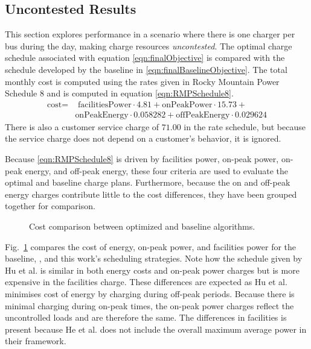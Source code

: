 \subsection{Uncontested Results}
This section explores performance in a scenario where there is one charger per bus during the day, making charge resources \textit{uncontested}. The optimal charge schedule associated with equation \eqref{eqn:finalObjective} is compared with the schedule developed by the baseline in \eqref{eqn:finalBaselineObjective}. The total monthly cost is computed using the rates given in Rocky Mountain Power Schedule 8 and is computed in equation \eqref{eqn:RMPSchedule8}.
	\begin{equation}\label{eqn:RMPSchedule8}
		\begin{aligned}
			\text{cost} = & \text{ facilitiesPower}\cdot 4.81 + \text{onPeakPower}\cdot 15.73 + \\ 
			& \text{onPeakEnergy}\cdot 0.058282 + \text{offPeakEnergy}\cdot 0.029624
		\end{aligned}
	\end{equation}
	There is also a customer service charge of $71.00$ in the rate schedule, but because the service charge does not depend on a customer's behavior, it is ignored.
\par Because \eqref{eqn:RMPSchedule8} is driven by facilities power, on-peak power, on-peak energy, and off-peak energy, these four criteria are used to evaluate the optimal and baseline charge plans.  Furthermore, because the on and off-peak energy charges contribute little to the cost differences, they have been grouped together for comparison.
\begin{figure}
	\centering
	\caption{Cost comparison between optimized and baseline algorithms.}
	\label{fig:costComparison}
\end{figure}
	\par  Fig.~\ref{fig:costComparison} compares the cost of energy, on-peak power, and facilities power for the baseline, \cite{He_2022_Battery}, and this work's scheduling strategies. Note how the schedule given by Hu et al. is similar in both energy costs and on-peak power charges but is more expensive in the facilities charge. These differences are expected as Hu et al. minimises cost of energy by charging during off-peak periods. Because there is minimal charging during on-peak times, the on-peak power charges reflect the uncontrolled loads and are therefore the same. The differences in facilities is present because He et al. does not include the overall maximum average power in their framework. 

